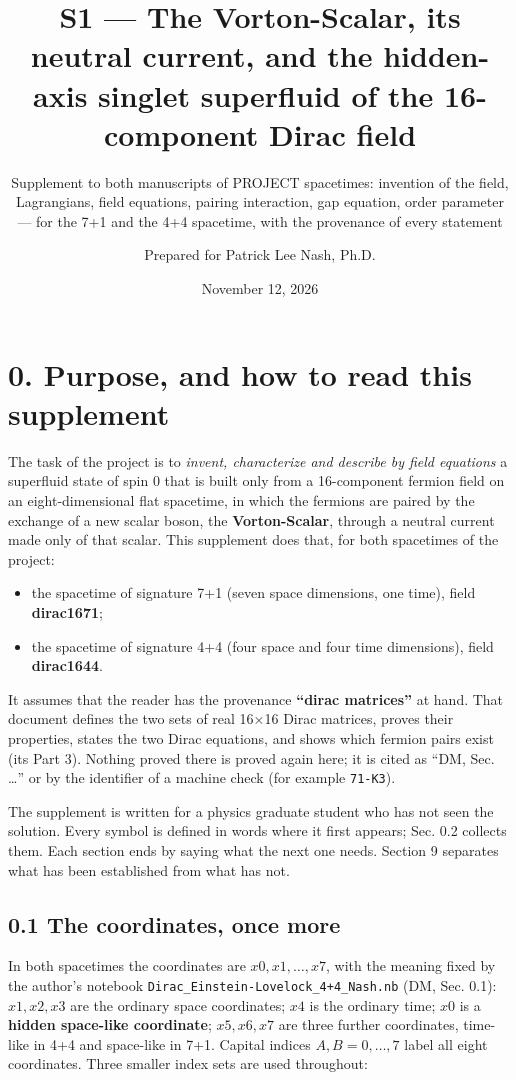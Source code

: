 \documentclass[
  10pt,
]{article}
\title{S1 --- The Vorton-Scalar, its neutral current, and the
hidden-axis singlet superfluid of the 16-component Dirac field}
\subtitle{Supplement to both manuscripts of PROJECT spacetimes:
invention of the field, Lagrangians, field equations, pairing
interaction, gap equation, order parameter --- for the 7+1 and the 4+4
spacetime, with the provenance of every statement}
\author{Prepared for Patrick Lee Nash, Ph.D.}
\date{November 12, 2026}
\providecommand{\tightlist}{%
  \setlength{\itemsep}{0pt}\setlength{\parskip}{0pt}}
\begin{document}
\maketitle

\hypertarget{purpose-and-how-to-read-this-supplement}{%
\section{0. Purpose, and how to read this
supplement}\label{purpose-and-how-to-read-this-supplement}}

The task of the project is to \emph{invent, characterize and describe by
field equations} a superfluid state of spin 0 that is built only from a
16-component fermion field on an eight-dimensional flat spacetime, in
which the fermions are paired by the exchange of a new scalar boson, the
\textbf{Vorton-Scalar}, through a neutral current made only of that
scalar. This supplement does that, for both spacetimes of the project:

\begin{itemize}
\tightlist
\item
  the spacetime of signature 7+1 (seven space dimensions, one time),
  field \textbf{dirac1671};
\item
  the spacetime of signature 4+4 (four space and four time dimensions),
  field \textbf{dirac1644}.
\end{itemize}

It assumes that the reader has the provenance \textbf{``dirac
matrices''} at hand. That document defines the two sets of real 16×16
Dirac matrices, proves their properties, states the two Dirac equations,
and shows which fermion pairs exist (its Part 3). Nothing proved there
is proved again here; it is cited as ``DM, Sec. \ldots{}'' or by the
identifier of a machine check (for example \texttt{71-K3}).

The supplement is written for a physics graduate student who has not
seen the solution. Every symbol is defined in words where it first
appears; Sec. 0.2 collects them. Each section ends by saying what the
next one needs. Section 9 separates what has been established from what
has not.

\hypertarget{the-coordinates-once-more}{%
\subsection{0.1 The coordinates, once
more}\label{the-coordinates-once-more}}

In both spacetimes the coordinates are \(x0,x1,\dots,x7\), with the
meaning fixed by the author's notebook
\texttt{Dirac\_Einstein-Lovelock\_4+4\_Nash.nb} (DM, Sec. 0.1):
\(x1,x2,x3\) are the ordinary space coordinates; \(x4\) is the ordinary
time; \(x0\) is a \textbf{hidden space-like coordinate}; \(x5,x6,x7\)
are three further coordinates, time-like in 4+4 and space-like in 7+1.
Capital indices \(A,B=0,\dots,7\) label all eight coordinates. Three
smaller index sets are used throughout:
\end{document}
